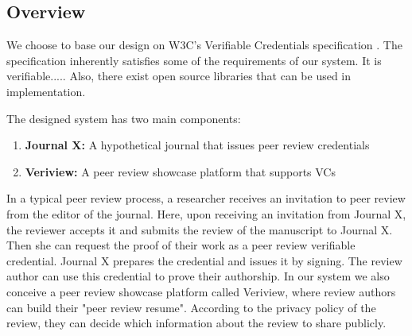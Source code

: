 





\subsection{Overview}

We choose to base our design on W3C's Verifiable Credentials specification \parencite{Sporny.18Kas2019}. The specification inherently satisfies some of the requirements of our system. It is verifiable..... Also, there exist open source libraries that can be used in implementation.

The designed system has two main components:

\begin{enumerate}
    \item \textbf{Journal X:} A hypothetical journal that issues peer review credentials
    \item \textbf{Veriview:} A peer review showcase platform that supports VCs
\end{enumerate}

In a typical peer review process, a researcher receives an invitation to peer review from the editor of the journal. Here, upon receiving an invitation from Journal X, the reviewer accepts it and submits the review of the manuscript to Journal X. Then she can request the proof of their work as a peer review verifiable credential. Journal X prepares the credential and issues it by signing. The review author can use this credential to prove their authorship.  In our system we also conceive a peer review showcase platform called Veriview, where review authors can build their "peer review resume". According to the privacy policy of the review, they can decide which information about the review to share publicly.

